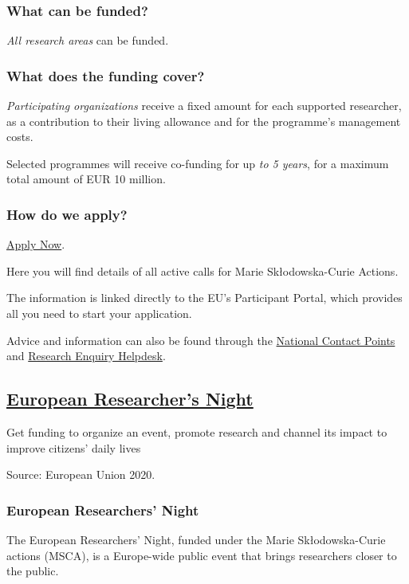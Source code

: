 \documentclass[oneside]{book}
\numberwithin{equation}{section}
\begin{document}
\subsubsection{What can be funded?}
\textit{All research areas} can be funded.

\subsubsection{What does the funding cover?}
\textit{Participating organizations} receive a fixed amount for each supported researcher, as a contribution to their living allowance and for the programme's management costs.

%
Selected programmes will receive co-funding for up \textit{to 5 years}, for a maximum total amount of EUR 10 million.

\subsubsection{How do we apply?}
\href{https://ec.europa.eu/research/mariecurieactions/actions/get-funding_en}{Apply Now}.

Here you will find details of all active calls for Marie Skłodowska-Curie Actions.

The information is linked directly to the EU's Participant Portal, which provides all you need to start your application.

%
Advice and information can also be found through the \href{http://ec.europa.eu/research/participants/portal/desktop/en/support/national_contact_points.html}{National Contact Points} and \href{http://ec.europa.eu/research/index.cfm?pg=enquiries}{Research Enquiry Helpdesk}.

\subsection{\href{https://ec.europa.eu/research/mariecurieactions/actions/european-researchers-night_en}{European Researcher's Night}}
\begin{center}
    Get funding to organize an event, promote research and channel its impact to improve citizens' daily lives
\end{center}
\textsf{Source: European Union 2020}.

\subsubsection{European Researchers' Night}
The European Researchers' Night, funded under the Marie Skłodowska-Curie actions (MSCA), is a Europe-wide public event that brings researchers closer to the public.
\end{document}
